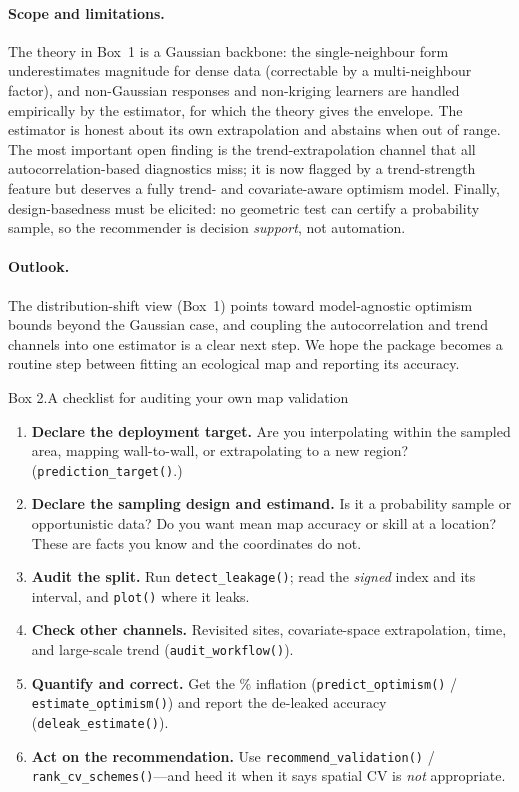 \documentclass[11pt,a4paper]{article}
\begin{document}
\paragraph{Scope and limitations.} The theory in Box~1 is a Gaussian backbone:
the single-neighbour form underestimates magnitude for dense data (correctable by a
multi-neighbour factor), and non-Gaussian responses and non-kriging learners are
handled empirically by the estimator, for which the theory gives the envelope. The
estimator is honest about its own extrapolation and abstains when out of range. The
most important open finding is the trend-extrapolation channel that all
autocorrelation-based diagnostics miss; it is now flagged by a trend-strength feature
but deserves a fully trend- and covariate-aware optimism model. Finally,
design-basedness must be elicited: no geometric test can certify a probability
sample, so the recommender is decision \emph{support}, not automation.

\paragraph{Outlook.} The distribution-shift view (Box~1) points toward model-agnostic
optimism bounds beyond the Gaussian case, and coupling the autocorrelation and trend
channels into one estimator is a clear next step. We hope the package becomes a
routine step between fitting an ecological map and reporting its accuracy.

\begin{meebox}{Box 2.\quad A checklist for auditing your own map validation}
\small
\begin{enumerate}[leftmargin=1.4em,itemsep=2pt]
\item \textbf{Declare the deployment target.} Are you interpolating within the
sampled area, mapping wall-to-wall, or extrapolating to a new region?
(\texttt{prediction\_target()}.)
\item \textbf{Declare the sampling design and estimand.} Is it a probability sample
or opportunistic data? Do you want mean map accuracy or skill at a location? These
are facts you know and the coordinates do not.
\item \textbf{Audit the split.} Run \texttt{detect\_leakage()}; read the
\emph{signed} index and its interval, and \texttt{plot()} where it leaks.
\item \textbf{Check other channels.} Revisited sites, covariate-space extrapolation,
time, and large-scale trend (\texttt{audit\_workflow()}).
\item \textbf{Quantify and correct.} Get the \% inflation
(\texttt{predict\_optimism()} / \texttt{estimate\_optimism()}) and report the
de-leaked accuracy (\texttt{deleak\_estimate()}).
\item \textbf{Act on the recommendation.} Use \texttt{recommend\_validation()} /
\texttt{rank\_cv\_schemes()}---and heed it when it says spatial CV is \emph{not}
appropriate.
\end{enumerate}
\end{meebox}
\end{document}
